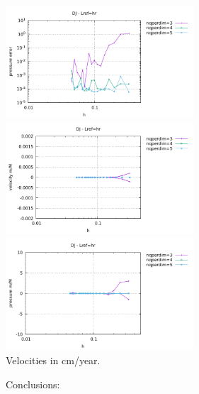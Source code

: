 \begin{center}
\includegraphics[width=7cm]{python_codes/fieldstone_133/results/bench3/DJ_Lref_hr/errors_p.pdf}\\
\includegraphics[width=7cm]{python_codes/fieldstone_133/results/bench3/DJ_Lref_hr/vel_stats.pdf}
\includegraphics[width=7cm]{python_codes/fieldstone_133/results/bench3/DJ_Lref_hr/press_stats.pdf}\\
{\captionfont Velocities in cm/year.}
\end{center}

Conclusions:

